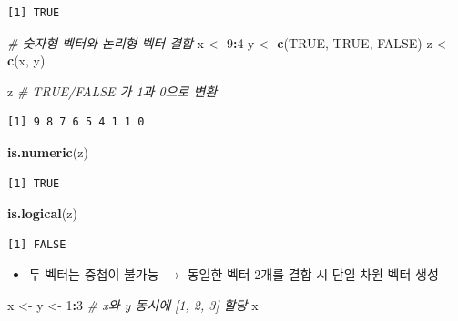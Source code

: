 \documentclass[
  11pt,
]{krantz}
\newenvironment{Shaded}{\begin{snugshade}}{\end{snugshade}}
\newcommand{\CommentTok}[1]{\textcolor[rgb]{0.37,0.37,0.37}{\textit{#1}}}
\newcommand{\DecValTok}[1]{\textcolor[rgb]{0.06,0.06,0.06}{#1}}
\newcommand{\KeywordTok}[1]{\textcolor[rgb]{0.27,0.27,0.27}{\textbf{#1}}}
\newcommand{\NormalTok}[1]{#1}
\newcommand{\OperatorTok}[1]{\textcolor[rgb]{0.43,0.43,0.43}{\textbf{#1}}}
\newcommand{\OtherTok}[1]{\textcolor[rgb]{0.37,0.37,0.37}{#1}}
\newcommand{\StringTok}[1]{\textcolor[rgb]{0.5,0.5,0.5}{#1}}
\providecommand{\tightlist}{%
  \setlength{\itemsep}{0pt}\setlength{\parskip}{0pt}}
\begin{document}
\begin{verbatim}
[1] TRUE
\end{verbatim}

\begin{Shaded}
\begin{Highlighting}[]
\CommentTok{# 숫자형 벡터와 논리형 벡터 결합}
\NormalTok{x <-}\StringTok{ }\DecValTok{9}\OperatorTok{:}\DecValTok{4}
\NormalTok{y <-}\StringTok{ }\KeywordTok{c}\NormalTok{(}\OtherTok{TRUE}\NormalTok{, }\OtherTok{TRUE}\NormalTok{, }\OtherTok{FALSE}\NormalTok{)}
\NormalTok{z <-}\StringTok{ }\KeywordTok{c}\NormalTok{(x, y)}

\NormalTok{z }\CommentTok{# TRUE/FALSE 가 1과 0으로 변환}
\end{Highlighting}
\end{Shaded}

\begin{verbatim}
[1] 9 8 7 6 5 4 1 1 0
\end{verbatim}

\begin{Shaded}
\begin{Highlighting}[]
\KeywordTok{is.numeric}\NormalTok{(z)}
\end{Highlighting}
\end{Shaded}

\begin{verbatim}
[1] TRUE
\end{verbatim}

\begin{Shaded}
\begin{Highlighting}[]
\KeywordTok{is.logical}\NormalTok{(z)}
\end{Highlighting}
\end{Shaded}

\begin{verbatim}
[1] FALSE
\end{verbatim}

\normalsize

\begin{itemize}
\tightlist
\item
  두 벡터는 중첩이 불가능 \(\rightarrow\) 동일한 벡터 2개를 결합 시 단일 차원 벡터 생성
\end{itemize}

\footnotesize

\begin{Shaded}
\begin{Highlighting}[]
\NormalTok{x <-}\StringTok{ }\NormalTok{y <-}\StringTok{ }\DecValTok{1}\OperatorTok{:}\DecValTok{3} \CommentTok{# x와 y 동시에 [1, 2, 3] 할당}
\NormalTok{x }
\end{Highlighting}
\end{Shaded}
\end{document}
